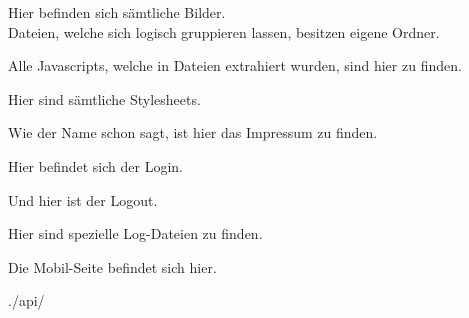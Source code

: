 \begin{description}[style=nextline]
\begin{description}[style=nextline]
					Hier befinden sich sämtliche Bilder.\\
					Dateien, welche sich logisch gruppieren lassen, besitzen eigene Ordner.
				\item[./scripts/]
					Alle Javascripts, welche in Dateien extrahiert wurden, sind hier zu finden.
				\item[./styles/]
					Hier sind sämtliche Stylesheets.	
			\end{description}
		\item[/impressum/]
			Wie der Name schon sagt, ist hier das Impressum zu finden.
		\item[/login/]
			Hier befindet sich der Login.
		\item[/logout/]
			Und hier ist der Logout.
		\item[/logs/]
			Hier sind spezielle Log-Dateien zu finden.
		\item[/mobile/]
			Die Mobil-Seite befindet sich hier.
			\begin{description}
				\item[./api/]
					
			\end{description}
\end{description}
